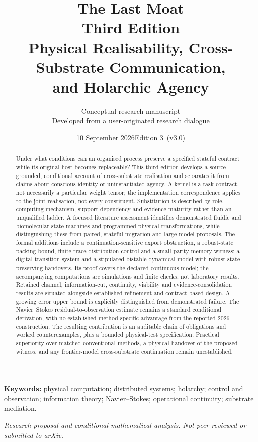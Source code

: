\documentclass[11pt,a4paper]{article}
\title{\vspace{-1.3em}\textbf{The Last Moat}\\[0.15em]\large Third Edition\\[0.5em]\Large Physical Realisability, Cross-Substrate Communication,\\and Holarchic Agency}
\author{\normalsize Conceptual research manuscript\\[-0.1em]\small Developed from a user-originated research dialogue}
\date{10 September 2026\quad\textbar\quad Edition 3\ (v3.0)}
\theoremstyle{definition}
\theoremstyle{remark}
\begin{document}
\maketitle
\begin{abstract}
Under what conditions can an organised process preserve a specified stateful contract while its original host becomes replaceable? This third edition develops a source-grounded, conditional account of cross-substrate realisation and separates it from claims about conscious identity or uninstantiated agency. A kernel is a task contract, not necessarily a particular weight tensor; the implementation correspondence applies to the joint realisation, not every constituent. Substitution is described by role, computing mechanism, support dependency and evidence maturity rather than an unqualified ladder. A focused literature assessment identifies demonstrated fluidic and biomolecular state machines and programmed physical transformations, while distinguishing these from paired, stateful migration and large-model proposals. The formal additions include a continuation-sensitive export obstruction, a robust-state packing bound, finite-trace distribution control and a small parity-memory witness: a digital transition system and a stipulated bistable dynamical model with robust state-preserving handovers. Its proof covers the declared continuous model; the accompanying computations are simulations and finite checks, not laboratory results. Retained channel, information-cut, continuity, viability and evidence-consolidation results are situated alongside established refinement and contract-based design. A growing error upper bound is explicitly distinguished from demonstrated failure. The Navier--Stokes residual-to-observation estimate remains a standard conditional derivation, with no established method-specific advantage from the reported 2026 construction. The resulting contribution is an auditable chain of obligations and worked counterexamples, plus a bounded physical-test specification. Practical superiority over matched conventional methods, a physical handover of the proposed witness, and any frontier-model cross-substrate continuation remain unestablished.
\end{abstract}
\noindent\textbf{Keywords:} physical computation; distributed systems; holarchy; control and observation; information theory; Navier--Stokes; operational continuity; substrate mediation.
\vspace{0.4em}
\begin{center}\small\emph{Research proposal and conditional mathematical analysis. Not peer-reviewed or submitted to arXiv.}\end{center}
\newpage
\begingroup
\small
\setlength{\parskip}{0pt}
\tableofcontents
\endgroup
\newpage
\end{document}
